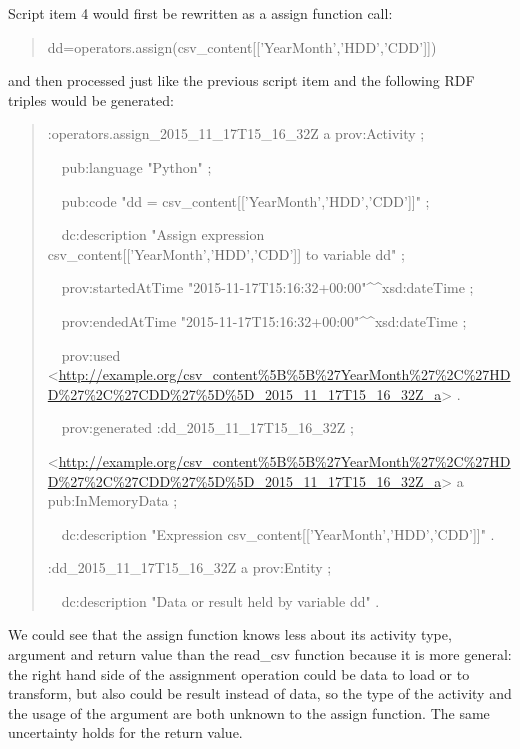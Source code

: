 Script item 4 would first be rewritten as a assign function call:
\begin{quotation}
	\noindent dd=operators.assign(csv\_content[['YearMonth','HDD','CDD']])
\end{quotation}
and then processed just like the previous script item and the following RDF triples would be generated:
\begin{quotation}
	\noindent:operators.assign\_2015\_11\_17T15\_16\_32Z a prov:Activity ;
	
	\noindent \ \ pub:language "Python" ;
	
	\noindent \ \ pub:code "dd = csv\_content[['YearMonth','HDD','CDD']]" ;
	
	\noindent \ \ dc:description "Assign expression csv\_content[['YearMonth','HDD','CDD']] to variable dd" ;
	
	\noindent \ \ prov:startedAtTime "2015-11-17T15:16:32+00:00"\^{}\^{}xsd:dateTime ;
	
	\noindent \ \ prov:endedAtTime "2015-11-17T15:16:32+00:00"\^{}\^{}xsd:dateTime ;
	
	\noindent \ \ prov:used <\url{http://example.org/csv_content%5B%5B%27YearMonth%27%2C%27HDD%27%2C%27CDD%27%5D%5D_2015_11_17T15_16_32Z_a}> .
		
	\noindent \ \ prov:generated :dd\_2015\_11\_17T15\_16\_32Z ;
	
	\noindent<\url{http://example.org/csv_content%5B%5B%27YearMonth%27%2C%27HDD%27%2C%27CDD%27%5D%5D_2015_11_17T15_16_32Z_a}> a pub:InMemoryData ;
		
	\noindent\ \ dc:description "Expression csv\_content[['YearMonth','HDD','CDD']]" .

	\noindent:dd\_2015\_11\_17T15\_16\_32Z a prov:Entity ;

	\noindent\ \ dc:description "Data or result held by variable dd" .
\end{quotation}
We could see that the assign function knows less about its activity type, argument and return value than the read\_csv function because it is more general: the right hand side of the assignment operation could be data to load or to transform, but also could be result instead of data, so the type of the activity and the usage of the argument are both unknown to the assign function. The same uncertainty holds for the return value.

